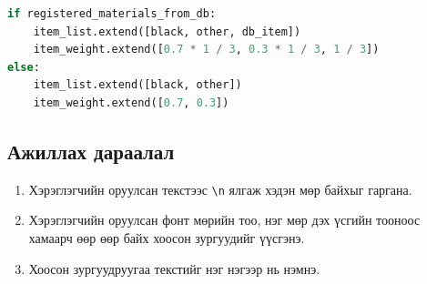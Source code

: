 \begin{lstlisting}[language=Python,caption={Сонголт хийх код},frame=single]
	if registered_materials_from_db:
	item_list.extend([black, other, db_item])
	item_weight.extend([0.7 * 1 / 3, 0.3 * 1 / 3, 1 / 3])
else:
	item_list.extend([black, other])
	item_weight.extend([0.7, 0.3])
\end{lstlisting}


\subsection{Ажиллах дараалал}
\begin{enumerate}
	\item Хэрэглэгчийн оруулсан текстээс \verb|\n| ялгаж хэдэн мөр байхыг гаргана.
	\item Хэрэглэгчийн оруулсан фонт мөрийн тоо, нэг мөр дэх үсгийн тооноос хамаарч өөр өөр байх хоосон зургуудийг үүсгэнэ.
	\item Хоосон зургуудруугаа текстийг нэг нэгээр нь нэмнэ.
	\end{enumerate}